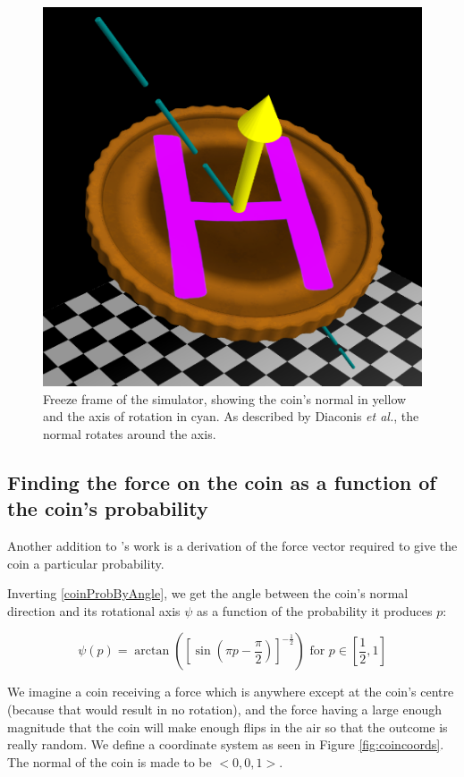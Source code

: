 \documentclass[english,12pt,a4paper,final]{article}
\begin{document}
\begin{figure}[H]
	\centering
	\includegraphics[width=0.5\linewidth]{flippingCoin}
	\caption{Freeze frame of the simulator, showing the coin's normal in yellow and the axis of rotation in cyan. As described by Diaconis \textit{et al.}, the normal rotates around the axis.}
	\label{fig:flippingcoin}
\end{figure}

\subsection{Finding the force on the coin as a function of the coin's probability}

Another addition to \textcite{unfairCoin}'s work is a derivation of the force vector required to give the coin a particular probability.

Inverting \eqref{coinProbByAngle}, we get the angle between the coin's normal direction and its rotational axis $\psi$ as a function of the probability it produces $p$:

\begin{equation}\label{coinAngleByProb}
	\psi(p) = \arctan\left(\left[\sin(\pi p-\frac{\pi}{2})\right]^{-\frac{1}{2}}\right) \text{ for } p \in \left[\frac{1}{2}, 1\right]
\end{equation}

We imagine a coin receiving a force which is anywhere except at the coin's centre (because that would result in no rotation), and the force having a large enough magnitude that the coin will make enough flips in the air so that the outcome is really random. We define a coordinate system as seen in Figure \ref{fig:coincoords}. The normal of the coin is made to be $<0, 0, 1>$.
\end{document}
